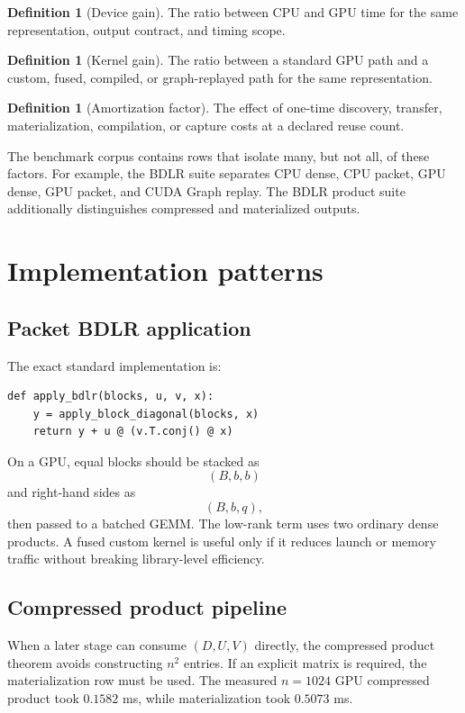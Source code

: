 \documentclass[11pt]{article}
\theoremstyle{definition}
\newtheorem{definition}[theorem]{Definition}
\theoremstyle{remark}
\begin{document}
\begin{definition}[Device gain]
The ratio between CPU and GPU time for the same representation, output contract, and timing scope.
\end{definition}

\begin{definition}[Kernel gain]
The ratio between a standard GPU path and a custom, fused, compiled, or graph-replayed path for the same representation.
\end{definition}

\begin{definition}[Amortization factor]
The effect of one-time discovery, transfer, materialization, compilation, or capture costs at a declared reuse count.
\end{definition}

The benchmark corpus contains rows that isolate many, but not all, of these factors. For example, the BDLR suite separates CPU dense, CPU packet, GPU dense, GPU packet, and CUDA Graph replay. The BDLR product suite additionally distinguishes compressed and materialized outputs.

\section{Implementation patterns}

\subsection{Packet BDLR application}

The exact standard implementation is:
\begin{lstlisting}
def apply_bdlr(blocks, u, v, x):
    y = apply_block_diagonal(blocks, x)
    return y + u @ (v.T.conj() @ x)
\end{lstlisting}

On a GPU, equal blocks should be stacked as
\[
(B,b,b)
\]
and right-hand sides as
\[
(B,b,q),
\]
then passed to a batched GEMM. The low-rank term uses two ordinary dense products. A fused custom kernel is useful only if it reduces launch or memory traffic without breaking library-level efficiency.

\subsection{Compressed product pipeline}

When a later stage can consume $(D,U,V)$ directly, the compressed product theorem avoids constructing $n^2$ entries. If an explicit matrix is required, the materialization row must be used. The measured $n=1024$ GPU compressed product took $0.1582$ ms, while materialization took $0.5073$ ms.
\end{document}
